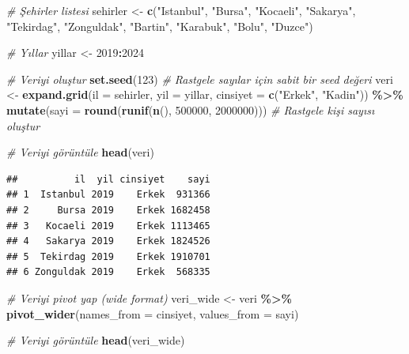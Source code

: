 \documentclass[
]{article}
\newenvironment{Shaded}{\begin{snugshade}}{\end{snugshade}}
\newcommand{\AttributeTok}[1]{\textcolor[rgb]{0.13,0.29,0.53}{#1}}
\newcommand{\CommentTok}[1]{\textcolor[rgb]{0.56,0.35,0.01}{\textit{#1}}}
\newcommand{\DecValTok}[1]{\textcolor[rgb]{0.00,0.00,0.81}{#1}}
\newcommand{\FunctionTok}[1]{\textcolor[rgb]{0.13,0.29,0.53}{\textbf{#1}}}
\newcommand{\NormalTok}[1]{#1}
\newcommand{\OtherTok}[1]{\textcolor[rgb]{0.56,0.35,0.01}{#1}}
\newcommand{\SpecialCharTok}[1]{\textcolor[rgb]{0.81,0.36,0.00}{\textbf{#1}}}
\newcommand{\StringTok}[1]{\textcolor[rgb]{0.31,0.60,0.02}{#1}}
\begin{document}
\begin{Shaded}
\begin{Highlighting}[]
\CommentTok{\# Şehirler listesi}
\NormalTok{sehirler }\OtherTok{\textless{}{-}} \FunctionTok{c}\NormalTok{(}\StringTok{"Istanbul"}\NormalTok{, }\StringTok{"Bursa"}\NormalTok{, }\StringTok{"Kocaeli"}\NormalTok{, }\StringTok{"Sakarya"}\NormalTok{, }\StringTok{"Tekirdag"}\NormalTok{, }
              \StringTok{"Zonguldak"}\NormalTok{, }\StringTok{"Bartin"}\NormalTok{, }\StringTok{"Karabuk"}\NormalTok{, }\StringTok{"Bolu"}\NormalTok{, }\StringTok{"Duzce"}\NormalTok{)}

\CommentTok{\# Yıllar}
\NormalTok{yillar }\OtherTok{\textless{}{-}} \DecValTok{2019}\SpecialCharTok{:}\DecValTok{2024}

\CommentTok{\# Veriyi oluştur}
\FunctionTok{set.seed}\NormalTok{(}\DecValTok{123}\NormalTok{) }\CommentTok{\# Rastgele sayılar için sabit bir seed değeri}
\NormalTok{veri }\OtherTok{\textless{}{-}} \FunctionTok{expand.grid}\NormalTok{(}\AttributeTok{il =}\NormalTok{ sehirler, }\AttributeTok{yil =}\NormalTok{ yillar, }\AttributeTok{cinsiyet =} \FunctionTok{c}\NormalTok{(}\StringTok{"Erkek"}\NormalTok{, }\StringTok{"Kadin"}\NormalTok{)) }\SpecialCharTok{\%\textgreater{}\%}
  \FunctionTok{mutate}\NormalTok{(}\AttributeTok{sayi =} \FunctionTok{round}\NormalTok{(}\FunctionTok{runif}\NormalTok{(}\FunctionTok{n}\NormalTok{(), }\DecValTok{500000}\NormalTok{, }\DecValTok{2000000}\NormalTok{))) }\CommentTok{\# Rastgele kişi sayısı oluştur}

\CommentTok{\# Veriyi görüntüle}
\FunctionTok{head}\NormalTok{(veri)}
\end{Highlighting}
\end{Shaded}

\begin{verbatim}
##          il  yil cinsiyet    sayi
## 1  Istanbul 2019    Erkek  931366
## 2     Bursa 2019    Erkek 1682458
## 3   Kocaeli 2019    Erkek 1113465
## 4   Sakarya 2019    Erkek 1824526
## 5  Tekirdag 2019    Erkek 1910701
## 6 Zonguldak 2019    Erkek  568335
\end{verbatim}

\begin{Shaded}
\begin{Highlighting}[]
\CommentTok{\# Veriyi pivot yap (wide format)}
\NormalTok{veri\_wide }\OtherTok{\textless{}{-}}\NormalTok{ veri }\SpecialCharTok{\%\textgreater{}\%}
  \FunctionTok{pivot\_wider}\NormalTok{(}\AttributeTok{names\_from =}\NormalTok{ cinsiyet, }\AttributeTok{values\_from =}\NormalTok{ sayi)}

\CommentTok{\# Veriyi görüntüle}
\FunctionTok{head}\NormalTok{(veri\_wide)}
\end{Highlighting}
\end{Shaded}
\end{document}
